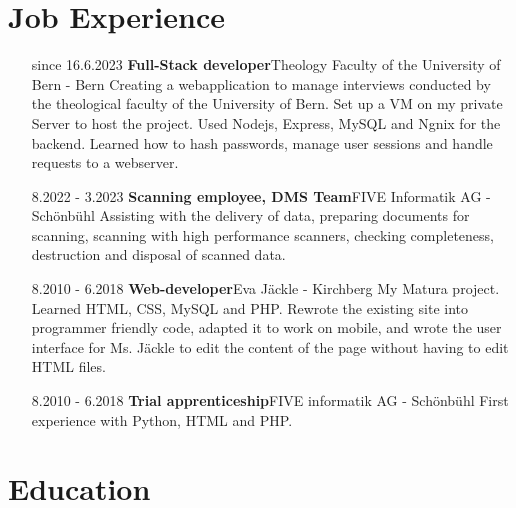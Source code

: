 \documentclass{article}
\begin{document}
\section{Job Experience}
\begin{itemize}[leftmargin=3cm, labelsep = 0.5cm ]
    \item[since 16.6.2023] \textbf{Full-Stack developer}\newline Theology Faculty of the University of Bern - Bern\newline
    Creating a webapplication to manage interviews conducted by the theological faculty of the University of Bern.
    Set up a VM on my private Server to host the project. Used Nodejs, Express, MySQL and Ngnix for the backend.
    Learned how to hash passwords, manage user sessions and handle requests to a webserver.
    \item[8.2022 - 3.2023] \textbf{Scanning employee, DMS Team}\newline FIVE Informatik AG - Sch\"onbühl \newline
    Assisting with the delivery of data, preparing documents for scanning, scanning with high performance scanners, 
    checking completeness, destruction and disposal of scanned data.
    \item[8.2010 - 6.2018] \textbf{Web-developer}\newline Eva J\"ackle - Kirchberg \newline 
    My Matura project. Learned HTML, CSS, MySQL and PHP. Rewrote the existing site into programmer friendly code,
    adapted it to work on mobile, and wrote the user interface for Ms. J\"ackle to edit the content of the page without
    having to edit HTML files.  \\
    \item[8.2010 - 6.2018] \textbf{Trial apprenticeship}\newline FIVE informatik AG - Sch\"onbühl \newline
    First experience with Python, HTML and PHP.\\ 
\end{itemize}

\section{Education}
\end{document}
